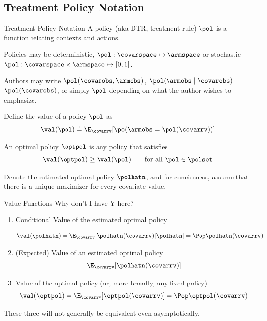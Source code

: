 \documentclass[aspectratio=169, professionalfonts]{beamer}
\begin{document}
\subsection{Treatment Policy Notation}

\begin{frame}{Treatment Policy Notation}
	A policy (aka DTR, treatment rule) $\pol$ is a function relating
	contexts and actions.

	\vfill
	Policies may be deterministic, $\pol: \covarspace
		\mapsto \armspace$ or stochastic
	$\pol: \covarspace \times \armspace \mapsto [0, 1]$.

	\vfill \pause

	Authors may write $\pol(\covarobs,
		\armobs)$, $\pol(\armobs \mid \covarobs)$, $\pol(\covarobs)$, or
	simply $\pol$ depending on what the author wishes to emphasize.

	\vfill \pause
	Define the value of a policy $\pol$ as
	\begin{equation*}
		\val(\pol) \doteq \E_{\covarrv}[\po(\armobs = \pol(\covarrv))]
	\end{equation*}

	\vfill \pause
	An optimal policy $\optpol$ is any policy that satisfies
	\begin{equation*}
		\val(\optpol) \geq \val(\pol) \qquad \text{for all }\pol \in
		\polset
	\end{equation*}

	\vfill \pause
	Denote the estimated optimal policy $\polhatn$, and for conciseness, assume
	that there is a unique maximizer for every covariate value.

\end{frame}

\begin{frame}{Value Functions}
	Why don't I have Y here?
	\begin{enumerate}
		\item Conditional Value of the estimated optimal policy

		      $$\val(\polhatn) = \E_{\covarrv}[\polhatn(\covarrv) \vert \polhatn] = \Pop \polhatn(\covarrv)$$

		      \vfill \pause

		\item (Expected) Value of an estimated optimal policy
		      $$\E_{\covarrv}[\polhatn(\covarrv)]$$

		      \vfill \pause

		\item Value of the optimal policy (or, more broadly, any fixed policy)
		      $$\val(\optpol) = \E_{\covarrv}[\optpol(\covarrv)] = \Pop
			      \optpol(\covarrv)$$
	\end{enumerate}

	\vfill \pause
	These three will not generally be equivalent even asymptotically.
\end{frame}
\end{document}

